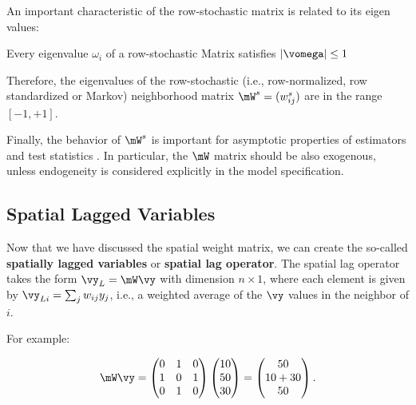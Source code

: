 \documentclass[english,12pt]{book}\usepackage[]{graphicx}\usepackage[]{xcolor}
\begin{document}
An important characteristic of the row-stochastic matrix is related to its eigen values:


\begin{theorem}\label{teo:eigen_values}
	Every eigenvalue $\omega_i$ of a row-stochastic Matrix satisfies $\left|\vomega\right|\leq 1$
\end{theorem}

Therefore, the eigenvalues of the row-stochastic (i.e., row-normalized, row standardized or Markov) neighborhood matrix $\mW^s=(w_{ij}^s)$ are in the range $\left[-1, +1\right]$.

Finally, the behavior of $\mW^s$ is important for asymptotic properties of estimators and test statistics \citep[][pp. 244]{AnselinBera1998}. In particular, the $\mW$ matrix should be also exogenous, unless endogeneity is considered explicitly in the model specification. 

\subsection{Spatial Lagged Variables}\label{sec:spatial_lag_var}

Now that we have discussed the spatial weight matrix, we can create the so-called \textbf{spatially lagged variables} or \textbf{spatial lag operator}. The spatial lag operator takes the form $\vy_L = \mW\vy$ with dimension $n \times 1$, where each element is given by $\vy_{Li} = \sum_{j}w_{ij}y_j$, i.e., a weighted average of the $\vy$ values in the neighbor of $i$.

For example:

\begin{equation*}
  \mW\vy =    \begin{pmatrix}
     0 & 1 & 0 \\
     1 & 0 & 1 \\
     0 & 1 & 0
  \end{pmatrix}
  \begin{pmatrix}
     10 \\
     50 \\
     30
  \end{pmatrix} =
  \begin{pmatrix}
     50 \\
     10 + 30 \\
     50
  \end{pmatrix}.
\end{equation*}
\end{document}
